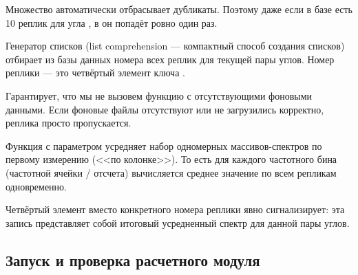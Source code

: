 \begin{syntaxdesc}
    \item[Сбор пар углов \mycode{angle_pairs = set()} (строка 3)] Множество  автоматически отбрасывает дубликаты. Поэтому даже если в базе есть 10 реплик для угла , в  он попадёт ровно один раз.
    \item[Фильтрация реплик \mycode{reps = [key[3] for key in ...]} (строки 14--19)] Генератор списков (list comprehension --- компактный способ создания списков) отбирает из базы данных номера всех реплик для текущей пары углов. Номер реплики --- это четвёртый элемент ключа .
    \item[Проверка наличия фона \mycode{if bg_key in data_store} (строка 25)] Гарантирует, что мы не вызовем функцию  с отсутствующими фоновыми данными. Если фоновые файлы отсутствуют или не загрузились корректно, реплика просто пропускается.
    \item[Арифметическое усреднение \mycode{np.mean(transmissions, axis=0)} (строка 41)] Функция  с параметром  усредняет набор одномерных массивов-спектров по первому измерению (<<по колонке>>). То есть для каждого частотного бина (частотной ячейки / отсчета) вычисляется среднее значение по всем репликам одновременно.
    \item[Тег усредненных данных \mycode{('spec_avg', angle1, angle2, None)} (строка 45)] Четвёртый элемент  вместо конкретного номера реплики явно сигнализирует: эта запись представляет собой итоговый усредненный спектр для данной пары углов.
\end{syntaxdesc}


\subsection{Запуск и проверка расчетного модуля}\label{ssec:spectrum_run}

